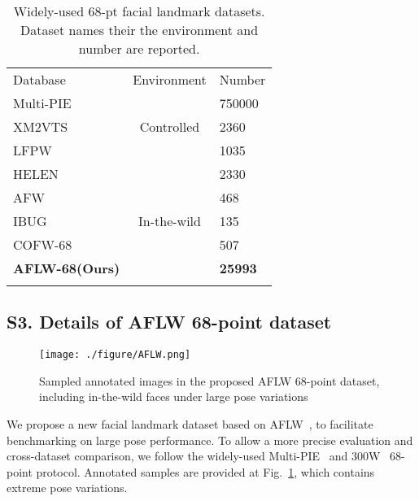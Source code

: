 \documentclass[10pt,twocolumn,letterpaper]{article}
\begin{document}
\begin{table}[htb]
\begin{center}
\begin{tabular}{l|c|l}
\Xhline{1.1pt}
Database  & \multicolumn{1}{l|}{Environment} & Number \\ \Xhline{1.1pt}
Multi-PIE~\cite{gross2010multi} & \multirow{3}{*}{Controlled}      & 750000 \\ \cline{1-1} \cline{3-3} 
XM2VTS~\cite{messer1999xm2vtsdb}    &                                  & 2360   \\ \cline{1-1} \cline{3-3} 
LFPW~\cite{LFPW}     &                                  & 1035   \\ \Xhline{1.1pt}
HELEN~\cite{HELEN}     & \multirow{5}{*}{In-the-wild}     & 2330   \\ \cline{1-1} \cline{3-3} 
AFW~\cite{AFW}       &                                  & 468    \\ \cline{1-1} \cline{3-3} 
IBUG      &                                  & 135    \\ \cline{1-1} \cline{3-3} 
COFW-68~\cite{cofw68}   &                                  & 507    \\ \cline{1-1} \cline{3-3} 
\textbf{AFLW-68(Ours)}   &                                  & \textbf{25993}  \\ \Xhline{1.1pt}
\end{tabular}
\caption{\label{68pts} \small{Widely-used 68-pt facial landmark datasets. Dataset names their the environment and number are reported.}}
\end{center}
\end{table}

\subsection*{S3. Details of AFLW 68-point dataset}

\begin{figure}[htb]
	\begin{center}
		\texttt{[image: ./figure/AFLW.png]}
	\end{center}
	\vspace{-0.5cm}
	\caption{\small{Sampled annotated images in the proposed AFLW 68-point dataset, including in-the-wild faces under large pose variations}}
	\vspace{-0.2cm}
	\label{fig:aflw}
\end{figure}

We propose a new facial landmark dataset based on AFLW~\cite{AFLW}, to facilitate benchmarking on large pose performance. To allow a more precise evaluation and cross-dataset comparison, we follow the widely-used Multi-PIE~\cite{gross2010multi} and 300W~\cite{sagonas2013300} 68-point protocol. Annotated samples are provided at Fig.~\ref{fig:aflw}, which contains extreme pose variations.
\end{document}
